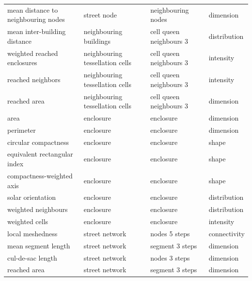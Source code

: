 \begin{longtable}{p{5cm}p{4cm}p{4cm}l}
     mean distance to neighbouring nodes &                     street node &         neighbouring nodes &    dimension \\
            mean inter-building distance &          neighbouring buildings &    cell queen neighbours 3 & distribution \\
             weighted reached enclosures & neighbouring tessellation cells &    cell queen neighbours 3 &    intensity \\
                       reached neighbors & neighbouring tessellation cells &    cell queen neighbours 3 &    intensity \\
                            reached area & neighbouring tessellation cells &    cell queen neighbours 3 &    dimension \\
                                    area &                       enclosure &                  enclosure &    dimension \\
                               perimeter &                       enclosure &                  enclosure &    dimension \\
                    circular compactness &                       enclosure &                  enclosure &        shape \\
            equivalent rectangular index &                       enclosure &                  enclosure &        shape \\
               compactness-weighted axis &                       enclosure &                  enclosure &        shape \\
                       solar orientation &                       enclosure &                  enclosure & distribution \\
                     weighted neighbours &                       enclosure &                  enclosure & distribution \\
                          weighted cells &                       enclosure &                  enclosure &    intensity \\
                        local meshedness &                  street network &              nodes 5 steps & connectivity \\
                     mean segment length &                  street network &            segment 3 steps &    dimension \\
                       cul-de-sac length &                  street network &              nodes 3 steps &    dimension \\
                            reached area &                  street network &            segment 3 steps &    dimension \\

\end{longtable}
